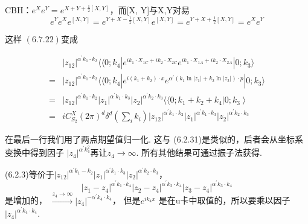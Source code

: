 \begin{remark}
CBH：$e^X e^Y=e^{X+Y+\frac{1}{2}[X, Y]}$，而[X, Y]与X,Y对易
$$
e^Y e^X e^{[X,Y]}=e^{Y+X-\frac{1}{2}[X, Y]}e^{[X,Y]}=e^{Y+X+\frac{1}{2}[X, Y]}=e^X e^Y
$$
\end{remark}

这样 $(6.7 .22)$变成

\begin{equation}
\begin{aligned}
&|z_{12}|^{\alpha^{\prime} k_{1} \cdot k_{2}}\langle\langle 0 ; k_{4}|e^{i k_{1} \cdot X_{1 C}+i k_{2} \cdot X_{2 C}} e^{i k_{1} \cdot X_{1 A}+i k_{2} \cdot X_{2 A}}| 0 ; k_{3}\rangle \\
=&|z_{12}|^{\alpha^{\prime} k_{1} \cdot k_{2}}\langle\langle 0 ; k_{4}|e^{i(k_{1}+k_{2}) \cdot x} e^{\alpha^{\prime}(k_{1} \ln |z_{1}|+k_{2} \ln |z_{2}|) \cdot p}| 0 ; k_{3}\rangle \\
=&\left|z_{12}\right|^{\alpha^{\prime} k_{1} \cdot k_{2}}\left|z_{1}\right|^{\alpha^{\prime} k_{1} \cdot k_{3}}\left|z_{2}\right|^{\alpha^{\prime} k_{2} \cdot k_{3}} \langle\langle0 ; k_{1}+k_{2}+k_{4}\left|0 ; k_{3}\right\rangle \\
=&i C_{S_{2}}^{X}(2 \pi)^{d} \delta^{d}\left(\sum_{i} k_{i}\right)\left|z_{12}\right|^{\alpha^{\prime} k_{1} \cdot k_{2}}\left|z_{1}\right|^{\alpha^{\prime} k_{1} \cdot k_{3}}\left|z_{2}\right|^{\alpha^{\prime} k_{2} \cdot k_{3}}
\end{aligned}
\end{equation}

在最后一行我们用了两点期望值归一化. 这与 (6.2.31)是类似的，后者会从坐标系变换中得到因子 $\left|z_{4}\right|^{\alpha^{\prime} k_{4}^{2}}$再让$z_{4} \rightarrow \infty $. 所有其他结果可通过振子法获得.\\

\begin{remark}
(6.2.3)等价于$\left|z_{12}\right|^{\alpha^{\prime} k_{1}-k_{2}}\left|z_{1}\right|^{\alpha^{\prime} k_{1} \cdot k_{3}}\left|z_{2}\right|^{\alpha^{\prime} k_{2} \cdot k_{3}}$，
$$\left|z_{1}-z_{4}\right|^{\alpha^{\prime} k_{1} \cdot k_{4}}\left|z_{2}-z_{4}\right|^{\alpha^{\prime} k_{2} \cdot k_{4}}\left|z_{3}-z_{4}\right|^{\alpha^{\prime} k_{3} \cdot k_{4}}$$
是增加的，
$\stackrel{z_{4} \rightarrow \infty}{\longrightarrow}\left|z_{4}\right|^{-\alpha^{\prime} k_{4} \cdot k_{4}}$，
但是$e^{i k_{4} x}$  是在u卡中取值的，所以要乘以因子$\left|z_{4}\right|^{\alpha^{\prime} k_{4} \cdot k_{4}}$.\\	
\end{remark}


